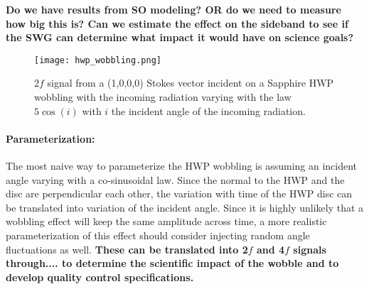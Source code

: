 \textbf{Do we have results from SO modeling? OR do we need to measure how big this is? Can we estimate the effect on the sideband to see if the SWG can determine what impact it would have on science goals?}

\begin{figure}
\centering
\texttt{[image: hwp\_wobbling.png]}
\caption{2$f$ signal from a (1,0,0,0) Stokes vector incident on a Sapphire HWP wobbling with the incoming radiation varying with the law $5\cos(i)$ with $i$ the incident angle of the incoming radiation.}
\label{hwpwobble}
\end{figure}

\paragraph{Parameterization:}
The most naive way to parameterize the HWP wobbling is assuming an incident angle varying with a co-sinusoidal law. Since the normal to the HWP and the disc are perpendicular each other, the variation with time of the HWP disc can be translated
into variation of the incident angle. Since it is highly unlikely that a wobbling effect will keep the same amplitude across time, a more realistic parameterization of this effect should consider injecting random angle fluctuations as well. \textbf{These can be translated into 2$f$ and 4$f$ signals through.... to determine the scientific impact of the wobble and to develop quality control specifications.}
